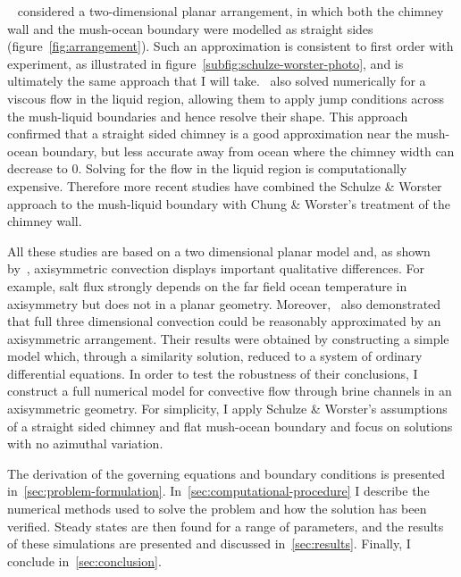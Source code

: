 \documentclass[11pt,twocolumn]{article}
\begin{document}

~\citet*{schulze-worster-98} considered a two-dimensional planar arrangement, in which both the chimney wall and the mush-ocean boundary were modelled as straight sides (figure~\ref{fig:arrangement}). Such an approximation is consistent to first order with experiment, as illustrated in figure~\ref{subfig:schulze-worster-photo}, and is ultimately the same approach that I will take.~\citet*{chung-worster-02} also solved numerically for a viscous flow in the liquid region, allowing them to apply jump conditions across the mush-liquid boundaries and hence resolve their shape. This approach confirmed that a straight sided chimney is a good approximation near the mush-ocean boundary, but less accurate away from ocean where the chimney width can decrease to $0$. Solving for the flow in the liquid region is computationally expensive. Therefore more recent studies \citep*{wells-et-al-10, wells-et-al-13} have combined the Schulze \& Worster approach to the mush-liquid boundary with Chung \& Worster's treatment of the chimney wall. 

All these studies are based on a two dimensional planar model and, as shown by~\citet*{rees-jones-worster-13}, axisymmetric convection displays important qualitative differences. For example, salt flux strongly depends on the far field ocean temperature in axisymmetry but does not in a planar geometry. Moreover,~\citet*{rees-jones-worster-13} also demonstrated that full three dimensional convection could be reasonably approximated by an axisymmetric arrangement. Their results were obtained by constructing a simple model which, through a similarity solution, reduced to a system of ordinary differential equations. In order to test the robustness of their conclusions, I construct a full numerical model for convective flow through brine channels in an axisymmetric geometry. For simplicity, I apply Schulze \& Worster's assumptions of a straight sided chimney and flat mush-ocean boundary and focus on solutions with no azimuthal variation.

The derivation of the governing equations and boundary conditions is presented in~\autoref{sec:problem-formulation}. In~\autoref{sec:computational-procedure} I describe the numerical methods used to solve the problem and how the solution has been verified. Steady states are then found for a range of parameters, and the results of these simulations are presented and discussed in~\autoref{sec:results}. Finally, I conclude in~\autoref{sec:conclusion}.
\end{document}
